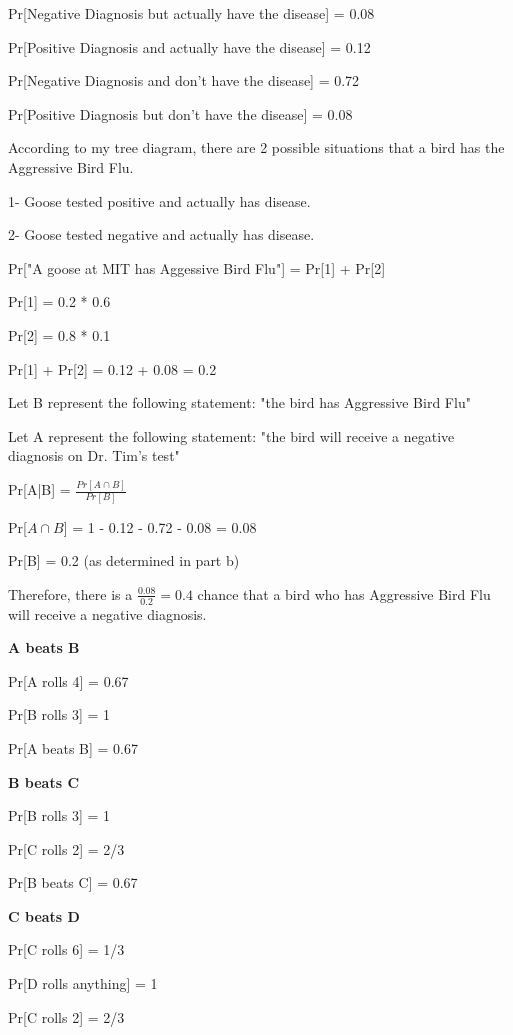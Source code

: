 \documentclass{6042}
\begin{document}
Pr[Negative Diagnosis but actually have the disease] = 0.08

Pr[Positive Diagnosis and actually have the disease] = 0.12

Pr[Negative Diagnosis and don't have the disease] = 0.72

Pr[Positive Diagnosis but don't have the disease] = 0.08


According to my tree diagram, there are 2 possible situations that a bird has the Aggressive Bird Flu.

1- Goose tested positive and actually has disease.

2- Goose tested negative and actually has disease.

Pr["A goose at MIT has Aggessive Bird Flu"] = Pr[1] + Pr[2]

Pr[1] = 0.2 * 0.6

Pr[2] = 0.8 * 0.1

Pr[1] + Pr[2] = 0.12 + 0.08 = 0.2

Let B represent the following statement: "the bird has Aggressive Bird Flu"

Let A represent the following statement: "the bird will receive a negative diagnosis on Dr. Tim's test"

Pr[A|B] = $\frac{Pr[A \cap B]}{Pr[B]}$

Pr[$A \cap B$] = 1 - 0.12 - 0.72 - 0.08 = 0.08

Pr[B] = 0.2 (as determined in part b)

Therefore, there is a $\frac{0.08}{0.2} = 0.4$ chance that a bird who has Aggressive Bird Flu will receive a negative diagnosis.



\textbf{A beats B}

Pr[A rolls 4] = 0.67

Pr[B rolls 3] = 1

Pr[A beats B] = 0.67

\textbf{B beats C}

Pr[B rolls 3] = 1

Pr[C rolls 2] = 2/3

Pr[B beats C] = 0.67

\textbf{C beats D}

Pr[C rolls 6] = 1/3

Pr[D rolls anything] = 1

Pr[C rolls 2] = 2/3
\end{document}

